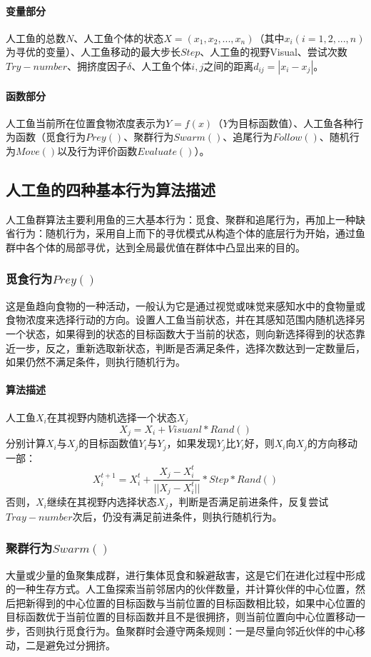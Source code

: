 \documentclass[UTF8]{ctexart}
\begin{document}
			\paragraph{变量部分}人工鱼的总数$N$、人工鱼个体的状态$X=(x_1, x_2, ..., x_n)$（其中$x_i (i=1,2,...,n)$为寻优的变量）、人工鱼移动的最大步长$Step$、人工鱼的视野Visual、尝试次数$Try-number$、拥挤度因子$\delta$、人工鱼个体$i, j$之间的距离$d_{ij}=|x_i-x_j|$。\par
			\paragraph{函数部分}人工鱼当前所在位置食物浓度表示为$Y=f(x)$（$Y$为目标函数值）、人工鱼各种行为函数（觅食行为$Prey()$、聚群行为$Swarm()$、追尾行为$Follow()$、随机行为$Move()$以及行为评价函数$Evaluate()$）。
		\subsection{人工鱼的四种基本行为算法描述}
			人工鱼群算法主要利用鱼的三大基本行为：觅食、聚群和追尾行为，再加上一种缺省行为：随机行为，采用自上而下的寻优模式从构造个体的底层行为开始，通过鱼群中各个体的局部寻优，达到全局最优值在群体中凸显出来的目的。
			\subsubsection{觅食行为$Prey()$}
				这是鱼趋向食物的一种活动，一般认为它是通过视觉或味觉来感知水中的食物量或食物浓度来选择行动的方向。设置人工鱼当前状态，并在其感知范围内随机选择另一个状态，如果得到的状态的目标函数大于当前的状态，则向新选择得到的状态靠近一步，反之，重新选取新状态，判断是否满足条件，选择次数达到一定数量后，如果仍然不满足条件，则执行随机行为。
				\paragraph{算法描述}人工鱼$X_i$在其视野内随机选择一个状态$X_j$
					$$X_j=X_i+Visuanl*Rand()$$
				分别计算$X_i$与$X_j$的目标函数值$Y_i$与$Y_j$，如果发现$Y_j$比$Y_i$好，则$X_i$向$X_j$的方向移动一部：
					$$X_i^{t+1}=X_i^t+\frac{X_j-X_i^t}{||X_j-X_i^t||}*Step*Rand()$$
				否则，$X_i$继续在其视野内选择状态$X_j$，判断是否满足前进条件，反复尝试$Tray-number$次后，仍没有满足前进条件，则执行随机行为。
			\subsubsection{聚群行为$Swarm()$}
				大量或少量的鱼聚集成群，进行集体觅食和躲避敌害，这是它们在进化过程中形成的一种生存方式。人工鱼探索当前邻居内的伙伴数量，并计算伙伴的中心位置，然后把新得到的中心位置的目标函数与当前位置的目标函数相比较，如果中心位置的目标函数优于当前位置的目标函数并且不是很拥挤，则当前位置向中心位置移动一步，否则执行觅食行为。鱼聚群时会遵守两条规则：一是尽量向邻近伙伴的中心移动，二是避免过分拥挤。
\end{document}
